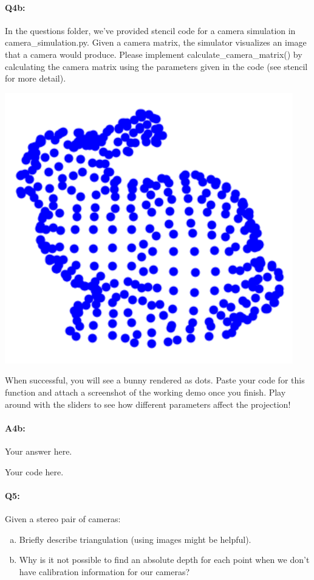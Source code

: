 




\pagebreak
\paragraph{Q4b:}
In the questions folder, we've provided stencil code for a camera simulation in {camera\_simulation.py}. Given a camera matrix, the simulator visualizes an image that a camera would produce. Please implement {calculate\_camera\_matrix()} by calculating the camera matrix using the parameters given in the code (see stencil for more detail). 

\includegraphics[width=0.3\linewidth]{bunny.png}

When successful, you will see a bunny rendered as dots. Paste your code for this function and attach a screenshot of the working demo once you finish. Play around with the sliders to see how different parameters affect the projection!

\paragraph{A4b:} Your answer here.

\begin{python}
Your code here.
\end{python}


\pagebreak
\paragraph{Q5:} Given a stereo pair of cameras:
\begin{enumerate} [(a)]
\item Briefly describe triangulation (using images might be helpful).
\item Why is it not possible to find an absolute depth for each point when we don't have calibration information for our cameras?
\end{enumerate}

